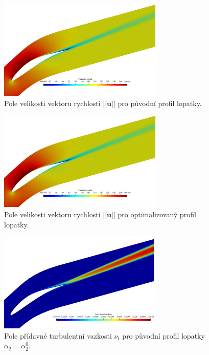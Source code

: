 \begin{figure}
	\includegraphics[width=0.7\textwidth]{img/magU_0.png}
	\caption{Pole velikosti vektoru rychlosti $ ||\mathbf{u}|| $ pro původní profil lopatky.}
	\label{fig:ghs1_U0}
\end{figure}

\begin{figure}
\includegraphics[width=0.7\textwidth]{img/magU_0.png}
\caption{Pole velikosti vektoru rychlosti $ ||\mathbf{u}|| $ pro optimalizovaný profil lopatky.}
\label{fig:ghs1_U12}
\end{figure}

\begin{figure}
	\includegraphics[width=0.7\textwidth]{img/nut_0.png}
	\caption{Pole přídavné turbulentní vazkosti $ \nu_t $ pro původní profil lopatky $ \alpha_{2}=\alpha_2^0 $.}
	\label{fig:ghs1_nut0}
\end{figure}

